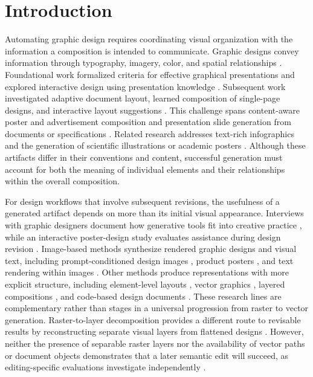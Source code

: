 \section{Introduction}
\label{sec:introduction}

Automating graphic design requires coordinating visual organization with the information a composition is intended to communicate.
Graphic designs convey information through typography, imagery, color, and spatial relationships \citep{huang2023survey,zou2025fragment}.
Foundational work formalized criteria for effective graphical presentations and explored interactive design using presentation knowledge \citep{mackinlay1986,roth1994interactive}.
Subsequent work investigated adaptive document layout, learned composition of single-page designs, and interactive layout suggestions \citep{jacobs2003adaptivegrid,odonovan2014singlepage,designscape2015}.
This challenge spans content-aware poster and advertisement composition \citep{posterlayout2023,cglgan2022,autoposter2023} and presentation slide generation from documents or specifications \citep{autopresent2025,pptagent2025,deepslides2026}.
Related research addresses text-rich infographics \citep{bizgen2025,gupta2026layercanvas} and the generation of scientific illustrations or academic posters \citep{autofigure2026,scifig2026,postergen2026}.
Although these artifacts differ in their conventions and content, successful generation must account for both the meaning of individual elements and their relationships within the overall composition.

For design workflows that involve subsequent revisions, the usefulness of a generated artifact depends on more than its initial visual appearance.
Interviews with graphic designers document how generative tools fit into creative practice \citep{tang2024designinterviews}, while an interactive poster-design study evaluates assistance during design revision \citep{vinci2021}.
Image-based methods synthesize rendered graphic designs and visual text, including prompt-conditioned design images \citep{designdiffusion2025}, product posters \citep{postermaker2025}, and text rendering within images \citep{textdiffuser22024}.
Other methods produce representations with more explicit structure, including element-level layouts \citep{layoutgan2019,layoutdm2023}, vector graphics \citep{vectorfusion2023,starvector2025,chat2svg2025}, layered compositions \citep{cole2023,opencole2024}, and code-based design documents \citep{designascode2026,editablevisual2026}.
These research lines are complementary rather than stages in a universal progression from raster to vector generation.
Raster-to-layer decomposition provides a different route to revisable results by reconstructing separate visual layers from flattened designs \citep{layerd2025,qwenimagelayered2026,jia2026pixelart}.
However, neither the presence of separable raster layers nor the availability of vector paths or document objects demonstrates that a later semantic edit will succeed, as editing-specific evaluations investigate independently \citep{svgeditbench2024,mildedit2026}.

